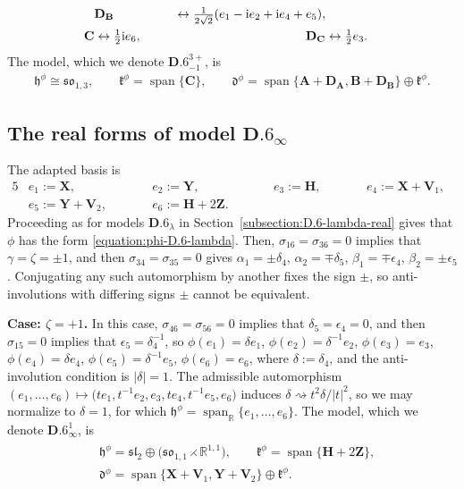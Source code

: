 \documentclass[pdftex]{sigma}
\newlength{\caseIndent}
\DeclareMathOperator{\spanOperator}{span}
\newcommand{\Span}[1]{\spanOperator\{{#1}\}}
\newcommand{\bbR}{\mathbb{R}}
\newcommand{\mbA}{\mathbf{A}}
\newcommand{\mbB}{\mathbf{B}}
\newcommand{\mbC}{\mathbf{C}}
\newcommand{\mbD}{\mathbf{D}}
\newcommand{\mbH}{\mathbf{H}}
\newcommand{\mbV}{\mathbf{V}}
\newcommand{\mbX}{\mathbf{X}}
\newcommand{\mbY}{\mathbf{Y}}
\newcommand{\mbZ}{\mathbf{Z}}
\newcommand{\mfd} {\mathfrak{d}}
\newcommand{\mfh} {\mathfrak{h}}
\newcommand{\mfk} {\mathfrak{k}}
\newcommand{\mfsl} {\mathfrak{sl}}
\newcommand{\mfso} {\mathfrak{so}}
\numberwithin{equation}{section}
\begin{document}
\begin{itemize}[leftmargin=\caseIndent]
\begin{alignat*}{4}
			&\mbD_{\mbB} &\leftrightarrow \tfrac{1}{2 \sqrt{2}} (e_1 - {\rm i} e_2 + {\rm i} e_4 + e_5) , \\
			 \mbC &\leftrightarrow \tfrac{1}{2} {\rm i} e_6 , \qquad
			&\mbD_{\mbC} &\leftrightarrow \tfrac{1}{2} e_3 .
		\end{alignat*}
		The model, which we denote $\mathbf{D.6}_{-1}^{3+}$, is
		\begin{gather*}
			\boxed{
 \mfh^{\phi} \cong \mfso_{1, 3} , \qquad
				\mfk^{\phi} = \Span{\mbC} , \qquad
				\mfd^{\phi} = \Span{\mbA + \mbD_{\mbA}, \mbB + \mbD_{\mbB}} \oplus \mfk^{\phi} .
			}
		\end{gather*}
\end{itemize}

\subsection[The real forms of model $\mathbf{D.6}_{\infty}$]{The real forms of model $\boldsymbol{\mathbf{D.6}_{\infty}}$}\label{subsection:D.6-infty-real}

The adapted basis is
\begin{alignat*}{5}
& e_1 := \mbX, \qquad && e_2 := \mbY, \qquad && e_3 := \mbH, \qquad && e_4 := \mbX + \mbV_1, & \\
& e_5 := \mbY + \mbV_2, \qquad && e_6 := \mbH + 2 \mbZ . \qquad && && &
\end{alignat*}
Proceeding as for models $\mathbf{D.6}_{\lambda}$ in Section~\ref{subsection:D.6-lambda-real} gives that $\phi$ has the form \eqref{equation:phi-D.6-lambda}. Then, $\sigma_{16} = \sigma_{36} = 0$ implies that $\gamma = \zeta = \pm 1$, and then $\sigma_{34} = \sigma_{35} = 0$ gives $\alpha_1 = \pm \delta_4$, $\alpha_2 = \mp \delta_5$, $\beta_1 = \mp \epsilon_4$, $\beta_2 = \pm \epsilon_5$. Conjugating any such automorphism by another fixes the sign $\pm$, so anti-involutions with differing signs $\pm$ cannot be equivalent.

\smallskip
\noindent \textbf{Case: $\zeta = + 1$.} In this case, $\sigma_{46} = \sigma_{56} = 0$ implies that $\delta_5 = \epsilon_4 = 0$, and then $\sigma_{15} = 0$ implies that $\epsilon_5 = \delta_4^{-1}$, so $\phi(e_1) = \delta e_1$, $\phi(e_2) = \delta^{-1} e_2$, $\phi(e_3) = e_3$, $\phi(e_4) = \delta e_4$, $\phi(e_5) = \delta^{-1} e_5$, $\phi(e_6) = e_6$, where $\delta := \delta_4$, and the anti-involution condition is $|\delta| = 1$. The admissible automorphism $(e_1, \ldots, e_6) \mapsto \big(t e_1, t^{-1} e_2, e_3, t e_4, t^{-1} e_5, e_6\big)$ induces $\delta \rightsquigarrow t^2 \delta / |t|^2$, so we may normalize to $\delta = 1$, for which $\mfh^{\phi} = \spanOperator_{\bbR}\{e_1, \ldots, e_6\}$. The model, which we denote $\mathbf{D.6}_{\infty}^1$, is
\begin{gather*}
	\boxed{\begin{split}
		&\mfh^{\phi} = \mfsl_2 \oplus \big(\mfso_{1, 1} \rightthreetimes \bbR^{1, 1}\big) , \qquad
		\mfk^{\phi} = \Span{\mbH + 2 \mbZ} , \\
	&	\mfd^{\phi} = \Span{\mbX + \mbV_1, \mbY + \mbV_2} \oplus \mfk^{\phi} .
	\end{split}}
\end{gather*}
\end{document}
